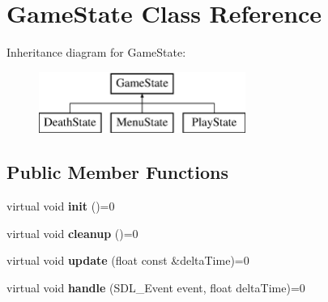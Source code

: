 \hypertarget{class_game_state}{}\section{Game\+State Class Reference}
\label{class_game_state}
Inheritance diagram for Game\+State\+:\begin{figure}[H]
\begin{center}
\leavevmode
\includegraphics[height=2.000000cm]{class_game_state}
\end{center}
\end{figure}
\subsection*{Public Member Functions}
\begin{DoxyCompactItemize}
\item 
\hypertarget{class_game_state_a6187cf801b77fa905cbe6ad385b4171c}{}virtual void {\bfseries init} ()=0\label{class_game_state_a6187cf801b77fa905cbe6ad385b4171c}

\item 
\hypertarget{class_game_state_a294cb7d91e037226d2223b12f95b1082}{}virtual void {\bfseries cleanup} ()=0\label{class_game_state_a294cb7d91e037226d2223b12f95b1082}

\item 
\hypertarget{class_game_state_a43dce19e114acea697c18e76c4e46893}{}virtual void {\bfseries update} (float const \&delta\+Time)=0\label{class_game_state_a43dce19e114acea697c18e76c4e46893}

\item 
\hypertarget{class_game_state_a35e7c67249e956a975acc180aa359709}{}virtual void {\bfseries handle} (S\+D\+L\+\_\+\+Event event, float delta\+Time)=0\label{class_game_state_a35e7c67249e956a975acc180aa359709}

\end{DoxyCompactItemize}
